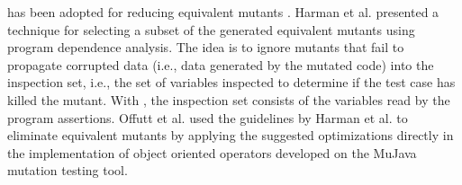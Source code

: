  has been adopted for reducing equivalent mutants \cite{voas1997software, hierons1999using, harman2001relationship}. Harman et al. \cite{harman2001relationship} presented a technique 
for selecting a subset of the generated equivalent mutants using program dependence analysis. 
The idea is to 
ignore
mutants that fail to propagate corrupted data (i.e., data generated by the mutated code)
into the inspection set, i.e., the set of variables inspected to determine if the test case has killed the mutant. With , the inspection set consists of the variables read by the program assertions.
Offutt et al. \cite{offutt2006class} used the guidelines by Harman et al. \cite{harman2001relationship} to eliminate equivalent mutants by applying the suggested optimizations directly in the implementation of object oriented operators developed on the MuJava mutation testing tool. 

